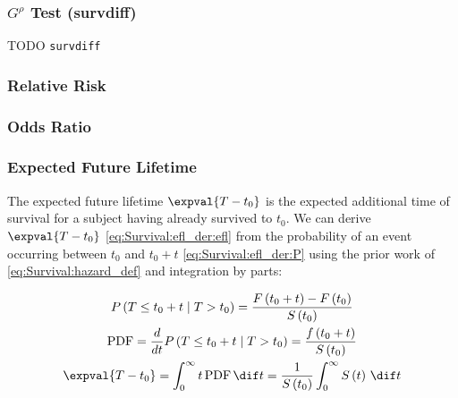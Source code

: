 \subsubsection{$G^{\rho}$ Test (survdiff)}
\label{additional:Survival:additional:survdiff}
TODO \texttt{survdiff}

\subsubsection{Relative Risk}
\label{additional:Survival:additional:RR}

\subsubsection{Odds Ratio}
\label{additional:Survival:additional:OR}

\subsubsection{Expected Future Lifetime}
\label{additional:Survival::additional:efl}
The expected future lifetime $\expval{T-t_{0}}$ is the
expected additional time of survival for a subject having already survived to $t_{0}$.
We can derive $\expval{T-t_{0}}$ \cref{eq:Survival:efl_der:efl}
from the probability of an event occurring between $t_{0}$ and $t_{0} + t$ \cref{eq:Survival:efl_der:P}
using the prior work of \cref{eq:Survival:hazard_def} and integration by parts:

\begin{subequations}\label{eq:Survival:efl_der}
\begin{gather}
P\left(T \leq t_{0} + t \mid T > t_{0}\right)
= \frac{F\left(t_{0} + t\right) - F\left(t_{0}\right)}{S\left(t_{0}\right)} \label{eq:Survival:efl_der:P} \\
\text{PDF}
= \frac{d}{dt} P\left(T \leq t_{0} + t \mid T > t_{0}\right)
= \frac{f\left(t_{0} + t\right)}{S\left(t_{0}\right)} \label{eq:Survival:efl_der:pdf} \\
\expval{T-t_{0}}
= \int_{0}^{\infty} t \, \text{PDF} \, \dif t
= \frac{1}{S\left(t_{0}\right)} \int_{0}^{\infty} S\left(t\right) \, \dif t \label{eq:Survival:efl_der:efl}
\end{gather}
\end{subequations}

